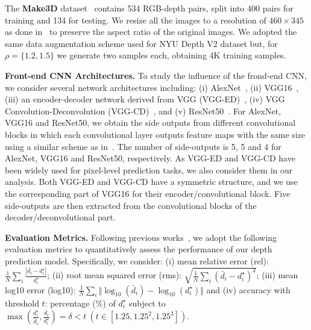 \documentclass[10pt,twocolumn,letterpaper]{article}
\begin{document}
The \textbf{Make3D} dataset~\cite{saxena2005learning} contains 534 RGB-depth pairs, split into 400 pairs for training and 134 for testing. 
We resize all the images to a resolution of $460 \times 345$ as done in~\cite{liu2014discrete} to preserve the aspect ratio 
of the original images. We adopted the same data augmentation scheme used for NYU Depth V2 dataset but,
for $\rho=\{1.2,1.5\}$ we generate two samples each, obtaining 4K training samples. 

\textbf{Front-end CNN Architectures.} 
To study the influence of the frond-end CNN, we consider several network architectures 
including: (i) AlexNet~\cite{krizhevsky2012imagenet}, (ii) VGG16~\cite{simonyan2014very}, 
(iii) an encoder-decoder network derived from VGG (VGG-ED)~\cite{badrinarayanan2015segnet}, 
(iv) VGG Convolution-Deconvolution (VGG-CD)~\cite{noh2015learning}, and (v) ResNet50~\cite{he2015deep}. For AlexNet, VGG16 and ResNet50, 
we obtain the side outputs from different convolutional blocks in which each convolutional layer outputs feature maps with the same size 
using a similar scheme as in~\cite{xie2015holistically}.
The number of side-outputs is 5, 5 and 4 for AlexNet, VGG16 and ResNet50, respectively. As VGG-ED and VGG-CD have been widely used for pixel-level prediction tasks, we also consider them in our analysis. Both VGG-ED and VGG-CD have a symmetric structure, and we use the corresponding part of VGG16 for their encoder/convolutional block. Five side-outputs are then extracted from the convolutional blocks of the decoder/deconvolutional part.

\textbf{Evaluation Metrics.}
Following previous works~\cite{eigen2015predicting,eigen2014depth,wang2015towards}, we adopt the following evaluation metrics 
to quantitatively assess the performance of our depth prediction model. Specifically, we consider: (i) mean relative error (rel): 
\( \frac{1}{N}\sum_i\frac{|\bar{d}_i - d_i^\star|}{d_i^\star} \); (ii) root mean squared error (rms): 
\( \sqrt{\frac{1}{N}\sum_{i}(\bar{d}_i - d_i^\star)^2} \); 
(iii) mean log10 error (log10): \( \frac{1}{N}\sum_i \Vert \log_{10}(\bar{d}_i) - \log_{10}(d_i^\star) \Vert \) and
(iv) accuracy with threshold $t$: percentage (\%) of $d_i^\star$ subject to $\max (\frac{d_i^\star}{\bar{d}_i}, \frac{\bar{d}_i}{d_i^\star}) = 
\delta < t~(t \in [1.25, 1.25^2, 1.25^3])$. 
\end{document}
